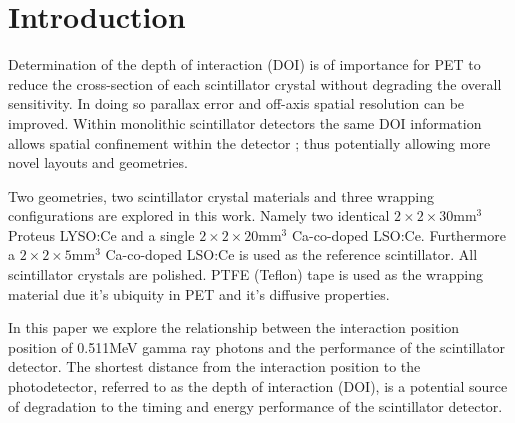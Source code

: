 \section{Introduction} 
Determination of the depth of interaction (DOI) is of importance for PET to reduce the cross-section of each scintillator crystal without degrading the overall sensitivity\cite{Moses_2001}\cite{Humm_Rosenfeld_Del_Guerra_2003}. In doing so parallax error and off-axis spatial resolution can be improved. Within monolithic scintillator detectors the same DOI information allows spatial confinement within the detector \cite{am_Borghi_Seifert_Schaart_2013}\cite{Maas_Bruyndonckx_Schaart_2012}; thus potentially allowing more novel\cite{Dendooven_Lohner_Beekman_2009}\cite{n_der_Lei_van_Dam_Schaart_2013} layouts and geometries.

Two geometries, two scintillator crystal materials and three wrapping configurations are explored in this work. Namely two identical $2\times2\times30$mm$^3$ Proteus LYSO:Ce and a single $2\times2\times20$mm$^3$ Ca-co-doped LSO:Ce. Furthermore a $2\times2\times5$mm$^3$ Ca-co-doped LSO:Ce is used as the reference scintillator. All scintillator crystals are polished. PTFE (Teflon) tape is used as the wrapping material due it's ubiquity in PET and it's diffusive properties.

In this paper we explore the relationship between the interaction position position of 0.511MeV gamma ray photons and the performance of the scintillator detector. The shortest distance from the interaction position to the photodetector, referred to as the depth of interaction (DOI), is a potential source of degradation to the timing and energy performance of the scintillator detector.
